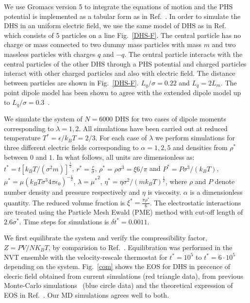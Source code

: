 \documentclass[preprint,pre,aps,superscriptaddress,a4paper]{revtex4}
\begin{document}
We use Gromacs version 5 to integrate the equations of motion and the PHS potential is implemented as a tabular form as in Ref.~\cite{faezeh:19:00}.
In  order to simulate the DHS in an uniform electric field, we  use the same model of  DHS as in Ref.~\cite{faezehastrid} which consists of 5 particles on a line Fig.~\ref{DHS-F}. The central particle has no charge or mass connected to two dummy mass particles with mass  $m$  and two massless  particles with charges $q$ and $-q$. The central particle interacts with the central particles of the other DHS through a PHS potential and charged particles interact with other charged particles and also with electric field. The distance between particles are shown in Fig.~\ref{DHS-F}. $L_q/\sigma=0.22$ and $L_q=2L_m$.  The point dipole model has been shown to agree with the extended dipole model up to  $L_q/\sigma=0.3$~\cite{Theiss:19:00,Drunsel:14:00,Ballenegger:04:00}.

We simulate the  system of $N=6000$ DHS for two cases of  dipole moments corresponding to $\lambda=1,2$. All simulations have been carried out at reduced temperature $T^* =\epsilon/k_BT=2/3$.
For each case of  $\lambda$ we perform simulations for three different electric fields corresponding to $\alpha=1,2,5$ and densities from  $\rho^*$ between $0$ and $1$.
In what follows, all units are dimensionless as: $t^*=t[ {k_B T}/({\sigma^2 m})]^\frac12$, $r^*= \frac{r}{\sigma}$, $\rho^*= \rho \sigma^3=\xi 6/\pi$ and $P^*=  P \sigma^3/(k_B T)$,  $\mu^*=  \mu (k_B T\sigma^3 4\pi \epsilon_0)^{-\frac12}$, $\lambda= {\mu^*}^2$, $\eta^*=\eta \sigma ^2 /( mk_B T)^\frac12 $, where $\rho$ and $P$  denote number density and  pressure respectively and $\eta$ is viscosity. $\alpha$ is a dimensionless quantity. The reduced volume fraction is $ \xi^*=\frac{\pi \rho^* }{6}$.
The electrostatic interactions are treated using the Particle Mesh Ewald (PME) method with cut-off length of $2.6 \sigma^*$.
Time steps for simulations is $\delta t^*=0.0011$.

We first equilibrate the system and verify the compressibility factor, $Z= PV/NK_BT$, by comparision to Ref.~\cite{Elfimova:13:01}.
Equilibration was performed in the NVT ensemble with the velocity-rescale thermostat for   $t^*= 10^5$  to $t^*=6 \cdot 10^5$ depending on the system.
Fig.~\ref{com} shows  the  EOS for DHS in precence of elecric field obtained from current simulations (red triangle data), from previous Monte-Carlo simulations~\cite{Elfimova:13:01} (blue circle data) and the theoretical expression of EOS in Ref.~\cite{Elfimova:13:01}.
Our MD simulations agrees well to both.
\end{document}

